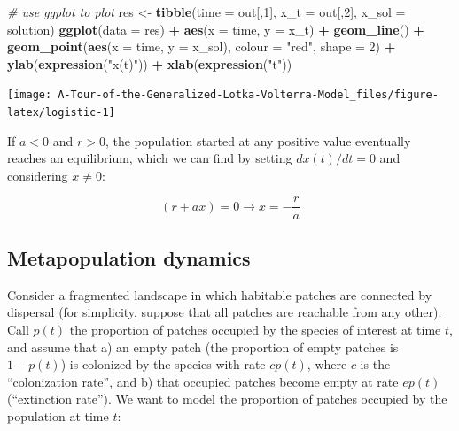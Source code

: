 \documentclass[]{book}
\newenvironment{Shaded}{\begin{snugshade}}{\end{snugshade}}
\newcommand{\CommentTok}[1]{\textcolor[rgb]{0.56,0.35,0.01}{\textit{#1}}}
\newcommand{\DataTypeTok}[1]{\textcolor[rgb]{0.13,0.29,0.53}{#1}}
\newcommand{\DecValTok}[1]{\textcolor[rgb]{0.00,0.00,0.81}{#1}}
\newcommand{\KeywordTok}[1]{\textcolor[rgb]{0.13,0.29,0.53}{\textbf{#1}}}
\newcommand{\NormalTok}[1]{#1}
\newcommand{\OperatorTok}[1]{\textcolor[rgb]{0.81,0.36,0.00}{\textbf{#1}}}
\newcommand{\StringTok}[1]{\textcolor[rgb]{0.31,0.60,0.02}{#1}}
\begin{document}
\begin{Shaded}
\begin{Highlighting}[]
\CommentTok{# use ggplot to plot}
\NormalTok{res <-}\StringTok{ }\KeywordTok{tibble}\NormalTok{(}\DataTypeTok{time =}\NormalTok{ out[,}\DecValTok{1}\NormalTok{], }\DataTypeTok{x_t =}\NormalTok{ out[,}\DecValTok{2}\NormalTok{], }\DataTypeTok{x_sol =}\NormalTok{ solution)}
\KeywordTok{ggplot}\NormalTok{(}\DataTypeTok{data =}\NormalTok{ res) }\OperatorTok{+}\StringTok{ }\KeywordTok{aes}\NormalTok{(}\DataTypeTok{x =}\NormalTok{ time, }\DataTypeTok{y =}\NormalTok{ x_t) }\OperatorTok{+}\StringTok{ }
\StringTok{  }\KeywordTok{geom_line}\NormalTok{() }\OperatorTok{+}\StringTok{ }
\StringTok{  }\KeywordTok{geom_point}\NormalTok{(}\KeywordTok{aes}\NormalTok{(}\DataTypeTok{x =}\NormalTok{ time, }\DataTypeTok{y =}\NormalTok{ x_sol), }\DataTypeTok{colour =} \StringTok{"red"}\NormalTok{, }\DataTypeTok{shape =} \DecValTok{2}\NormalTok{) }\OperatorTok{+}\StringTok{ }
\StringTok{  }\KeywordTok{ylab}\NormalTok{(}\KeywordTok{expression}\NormalTok{(}\StringTok{"x(t)"}\NormalTok{)) }\OperatorTok{+}\StringTok{ }\KeywordTok{xlab}\NormalTok{(}\KeywordTok{expression}\NormalTok{(}\StringTok{"t"}\NormalTok{))}
\end{Highlighting}
\end{Shaded}

\begin{center}\texttt{[image: A-Tour-of-the-Generalized-Lotka-Volterra-Model\_files/figure-latex/logistic-1]} \end{center}

If \(a < 0\) and \(r > 0\), the population started at any positive value eventually reaches an equilibrium, which we can find by setting \(dx(t)/dt = 0\) and considering \(x \neq 0\):

\[
(r + a x) = 0 \to x = -\frac{r}{a}
\]

\hypertarget{metapopulation-dynamics}{%
\subsection{Metapopulation dynamics}\label{metapopulation-dynamics}}

Consider a fragmented landscape in which habitable patches are connected by dispersal (for simplicity, suppose that all patches are reachable from any other). Call \(p(t)\) the proportion of patches occupied by the species of interest at time \(t\), and assume that a) an empty patch (the proportion of empty patches is \(1 - p(t)\)) is colonized by the species with rate \(c p(t)\), where \(c\) is the ``colonization rate'', and b) that occupied patches become empty at rate \(e p(t)\) (``extinction rate''). We want to model the proportion of patches occupied by the population at time \(t\):
\end{document}
